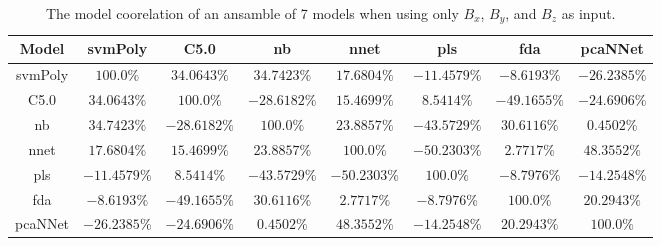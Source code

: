 \begin{table}[!ht]
	\centering
	\begin{tabular}{|c|c|c|c|c|c|c|c|}
		\hline
		Model & svmPoly & C5.0 & nb & nnet & pls & fda & pcaNNet \\ \hline
		svmPoly & $100.0\%$ & $34.0643\%$ & $34.7423\%$ & $17.6804\%$ & $-11.4579\%$ & $-8.6193\%$ & $-26.2385\%$ \\ \hline
		C5.0 & $34.0643\%$ & $100.0\%$ & $-28.6182\%$ & $15.4699\%$ & $8.5414\%$ & $-49.1655\%$ & $-24.6906\%$ \\ \hline
		nb & $34.7423\%$ & $-28.6182\%$ & $100.0\%$ & $23.8857\%$ & $-43.5729\%$ & $30.6116\%$ & $0.4502\%$ \\ \hline
		nnet & $17.6804\%$ & $15.4699\%$ & $23.8857\%$ & $100.0\%$ & $-50.2303\%$ & $2.7717\%$ & $48.3552\%$ \\ \hline
		pls & $-11.4579\%$ & $8.5414\%$ & $-43.5729\%$ & $-50.2303\%$ & $100.0\%$ & $-8.7976\%$ & $-14.2548\%$ \\ \hline
		fda & $-8.6193\%$ & $-49.1655\%$ & $30.6116\%$ & $2.7717\%$ & $-8.7976\%$ & $100.0\%$ & $20.2943\%$ \\ \hline
		pcaNNet & $-26.2385\%$ & $-24.6906\%$ & $0.4502\%$ & $48.3552\%$ & $-14.2548\%$ & $20.2943\%$ & $100.0\%$ \\ \hline
	\end{tabular}
	\caption{The model coorelation of an ansamble of 7 models when using only $B_{x}$, $B_{y}$, and $B_{z}$ as input.}
	\label{tab:ansamble7:coord}
\end{table}
